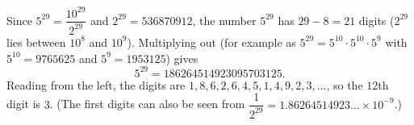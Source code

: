 Since $5^{29}=\dfrac{10^{29}}{2^{29}}$ and $2^{29}=536870912$, the number $5^{29}$ has $29-8=21$ digits ($2^{29}$ lies between $10^8$ and $10^9$). Multiplying out (for example as $5^{29}=5^{10}\cdot5^{10}\cdot5^{9}$ with $5^{10}=9765625$ and $5^9=1953125$) gives
\[
5^{29}=186264514923095703125 .
\]
Reading from the left, the digits are $1,8,6,2,6,4,5,1,4,9,2,3,\dots$, so the $12$th digit is $\boxed{3}$. (The first digits can also be seen from $\dfrac{1}{2^{29}}=1.86264514923\ldots\times10^{-9}$.)
